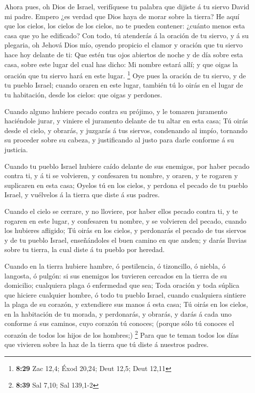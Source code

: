  Ahora pues, oh Dios de Israel, verifíquese tu palabra
que dijiste á tu siervo David mi padre.  Empero ¿es
verdad que Dios haya de morar sobre la tierra? He aquí que los cielos,
los cielos de los cielos, no te pueden contener: ¿cuánto menos esta casa
que yo he edificado?  Con todo, tú atenderás á la oración
de tu siervo, y á su plegaria, oh Jehová Dios mío, oyendo propicio el
clamor y oración que tu siervo hace hoy delante de ti: 
Que estén tus ojos abiertos de noche y de día sobre esta casa, sobre
este lugar del cual has dicho: Mi nombre estará allí; y que oigas la
oración que tu siervo hará en este lugar. \footnote{\textbf{8:29} Zac
  12,4; Éxod 20,24; Deut 12,5; Deut 12,11}  Oye pues la
oración de tu siervo, y de tu pueblo Israel; cuando oraren en este
lugar, también tú lo oirás en el lugar de tu habitación, desde los
cielos: que oigas y perdones.

 Cuando alguno hubiere pecado contra su prójimo, y le
tomaren juramento haciéndole jurar, y viniere el juramento delante de tu
altar en esta casa;  Tú oirás desde el cielo, y obrarás,
y juzgarás á tus siervos, condenando al impío, tornando su proceder
sobre su cabeza, y justificando al justo para darle conforme á su
justicia.

 Cuando tu pueblo Israel hubiere caído delante de sus
enemigos, por haber pecado contra ti, y á ti se volvieren, y confesaren
tu nombre, y oraren, y te rogaren y suplicaren en esta casa;
 Oyelos tú en los cielos, y perdona el pecado de tu
pueblo Israel, y vuélvelos á la tierra que diste á sus padres.

 Cuando el cielo se cerrare, y no lloviere, por haber
ellos pecado contra ti, y te rogaren en este lugar, y confesaren tu
nombre, y se volvieren del pecado, cuando los hubieres afligido;
 Tú oirás en los cielos, y perdonarás el pecado de tus
siervos y de tu pueblo Israel, enseñándoles el buen camino en que anden;
y darás lluvias sobre tu tierra, la cual diste á tu pueblo por heredad.

 Cuando en la tierra hubiere hambre, ó pestilencia, ó
tizoncillo, ó niebla, ó langosta, ó pulgón: si sus enemigos los tuvieren
cercados en la tierra de su domicilio; cualquiera plaga ó enfermedad que
sea;  Toda oración y toda súplica que hiciere cualquier
hombre, ó todo tu pueblo Israel, cuando cualquiera sintiere la plaga de
su corazón, y extendiere sus manos á esta casa;  Tú oirás
en los cielos, en la habitación de tu morada, y perdonarás, y obrarás, y
darás á cada uno conforme á sus caminos, cuyo corazón tú conoces;
(porque sólo tú conoces el corazón de todos los hijos de los hombres;)
\footnote{\textbf{8:39} Sal 7,10; Sal 139,1-2}  Para que
te teman todos los días que vivieren sobre la haz de la tierra que tú
diste á nuestros padres.

